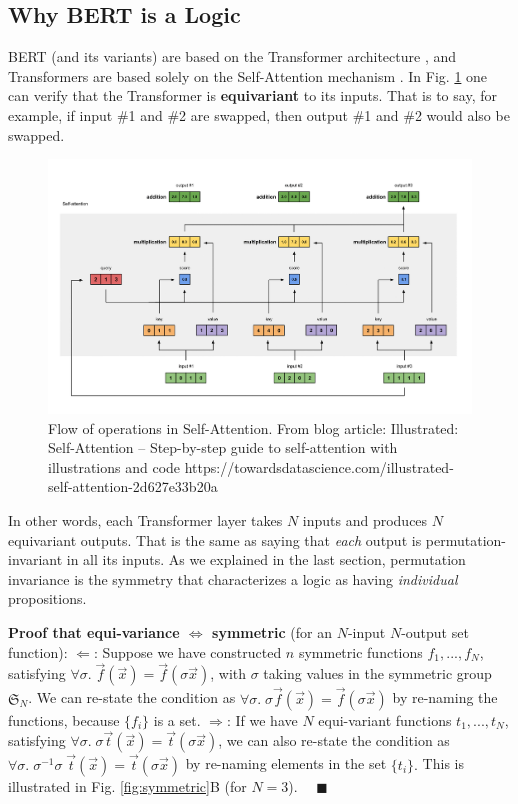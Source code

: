 \documentclass[orivec]{llncs}
\begin{document}
\subsection{Why BERT is a Logic}

BERT (and its variants) are based on the Transformer architecture \cite{Devlin2018}, and Transformers are based solely on the Self-Attention mechanism \cite{Vaswani2017}.  In Fig. \ref{fig:self-attention} one can verify that the Transformer is \textbf{equivariant} to its inputs.  That is to say, for example, if input \#1 and \#2 are swapped, then output \#1 and \#2 would also be swapped.

\begin{figure}[h]
	\includegraphics[scale=0.2]{self-attention.png}
	\caption{Flow of operations in Self-Attention.  From blog article: Illustrated: Self-Attention	-- Step-by-step guide to self-attention with illustrations and code https://towardsdatascience.com/illustrated-self-attention-2d627e33b20a }
	\label{fig:self-attention}
\end{figure}

In other words, each Transformer layer takes $N$ inputs and produces $N$ equivariant outputs.  That is the same as saying that \textit{each} output is permutation-invariant in all its inputs.  As we explained in the last section, permutation invariance is the symmetry that characterizes a logic as having \textit{individual} propositions.

\textbf{Proof that equi-variance $\Leftrightarrow$ symmetric} (for an $N$-input $N$-output set function): $\Leftarrow$: Suppose we have constructed $n$ symmetric functions $f_1, ..., f_N$, satisfying $\forall \sigma. \; \vec{f}(\vec{x}) = \vec{f}(\sigma \vec{x})$, with $\sigma$ taking values in the symmetric group $\mathfrak{S}_N$.  We can re-state the condition as $\forall \sigma. \; \sigma \vec{f}(\vec{x}) = \vec{f}(\sigma \vec{x})$ by re-naming the functions, because $\{ f_i \}$ is a set.  $\Rightarrow$: If we have $N$ equi-variant functions $t_1, ..., t_N$, satisfying $\forall \sigma. \; \sigma \vec{t}(\vec{x}) = \vec{t}(\sigma \vec{x})$, we can also re-state the condition as $\forall \sigma. \; \sigma^{-1} \sigma \; \vec{t}(\vec{x}) = \vec{t}(\sigma \vec{x})$ by re-naming elements in the set $\{ t_i \}.$ This is illustrated in Fig. \ref{fig:symmetric}B (for $N = 3$). $\quad \blacksquare$
\end{document}
